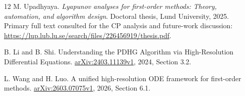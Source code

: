 \documentclass[11pt]{article}
\theoremstyle{remark}\newtheorem{remark}[theorem]{Remark}
\begin{document}
\begin{thebibliography}{12}
 M. Upadhyaya.
\emph{Lyapunov analyses for first-order methods: Theory, automation, and algorithm design}.
Doctoral thesis, Lund University, 2025.
Primary full text consulted for the CP analysis and future-work discussion:
\url{https://lup.lub.lu.se/search/files/226456919/thesis.pdf}.

 B. Li and B. Shi.
Understanding the PDHG Algorithm via High-Resolution Differential Equations.
\href{https://arxiv.org/html/2403.11139v1}{arXiv:2403.11139v1}, 2024, Section 3.2.

 L. Wang and H. Luo.
A unified high-resolution ODE framework for first-order methods.
\href{https://arxiv.org/html/2603.07075v1}{arXiv:2603.07075v1}, 2026, Section 6.1.
\end{thebibliography}
\end{document}
